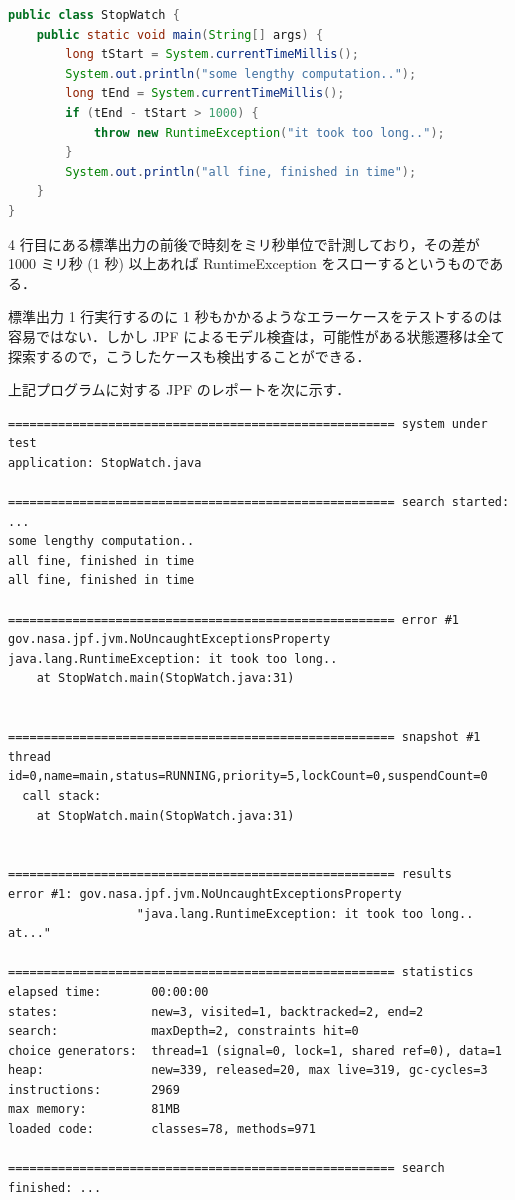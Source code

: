 \documentclass[a4j,12pt]{jarticle}
\begin{document}
\begin{lstlisting}[label=src:ex-exception, caption=例外の検出,language=Java]
public class StopWatch {
    public static void main(String[] args) {
        long tStart = System.currentTimeMillis();
        System.out.println("some lengthy computation..");
        long tEnd = System.currentTimeMillis();
        if (tEnd - tStart > 1000) {
            throw new RuntimeException("it took too long..");
        }
        System.out.println("all fine, finished in time");
    }
}
\end{lstlisting}

4 行目にある標準出力の前後で時刻をミリ秒単位で計測しており，その差が 1000 ミリ秒 (1 秒) 以上あれば RuntimeException をスローするというものである．

標準出力 1 行実行するのに 1 秒もかかるようなエラーケースをテストするのは容易ではない．しかし JPF によるモデル検査は，可能性がある状態遷移は全て探索するので，こうしたケースも検出することができる．

上記プログラムに対する JPF のレポートを次に示す．

\begin{verbatim}
====================================================== system under test
application: StopWatch.java

====================================================== search started: ...
some lengthy computation..
all fine, finished in time
all fine, finished in time

====================================================== error #1
gov.nasa.jpf.jvm.NoUncaughtExceptionsProperty
java.lang.RuntimeException: it took too long..
	at StopWatch.main(StopWatch.java:31)


====================================================== snapshot #1
thread id=0,name=main,status=RUNNING,priority=5,lockCount=0,suspendCount=0
  call stack:
	at StopWatch.main(StopWatch.java:31)


====================================================== results
error #1: gov.nasa.jpf.jvm.NoUncaughtExceptionsProperty 
                  "java.lang.RuntimeException: it took too long..  at..."

====================================================== statistics
elapsed time:       00:00:00
states:             new=3, visited=1, backtracked=2, end=2
search:             maxDepth=2, constraints hit=0
choice generators:  thread=1 (signal=0, lock=1, shared ref=0), data=1
heap:               new=339, released=20, max live=319, gc-cycles=3
instructions:       2969
max memory:         81MB
loaded code:        classes=78, methods=971

====================================================== search finished: ...
\end{verbatim}
\end{document}

